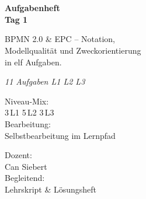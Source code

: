 \documentclass[11pt,a4paper,oneside]{article}
\newcommand{\caveatfontfallback}{\itshape}
\newcommand\caveatfont{\caveatfontfallback}%
\begin{document}
\begin{titlepage}
  \pagestyle{empty}
  \vspace*{1.5cm}
  \\[2pt]
  \noindent{\color{lpAccent}\rule{\linewidth}{1.2pt}}\\[4pt]

  \vspace{3cm}
  {\sffamily\fontsize{30}{34}\selectfont\bfseries\color{lpInk}Aufgabenheft\\Tag 1\par}

  \vspace{0.7cm}
  {\sffamily\large\color{lpGray}BPMN 2.0 \& EPC -- Notation,\\Modellqualit\"at und Zweck\-orientierung\\in elf Aufgaben.\par}

  \vspace{1.5cm}
  {\caveatfont\LARGE\color{lpAmber}11 Aufgaben \textperiodcentered{} L1 \textperiodcentered{} L2 \textperiodcentered{} L3}\par

  \vfill

  \noindent\begin{minipage}{0.55\linewidth}
    {\sffamily\footnotesize\color{lpGray}Niveau-Mix:}\\
    {\sffamily\small\color{lpInk}3\,\textsf{L1} \textperiodcentered{} 5\,\textsf{L2} \textperiodcentered{} 3\,\textsf{L3}}\\[10pt]
    {\sffamily\footnotesize\color{lpGray}Bearbeitung:}\\
    {\sffamily\small\color{lpInk}Selbstbearbeitung im Lernpfad}
  \end{minipage}\hfill
  \begin{minipage}{0.4\linewidth}
    \raggedleft
    {\sffamily\footnotesize\color{lpGray}Dozent:}\\
    {\sffamily\small\color{lpInk}Can Siebert}\\[10pt]
    {\sffamily\footnotesize\color{lpGray}Begleitend:}\\
    {\sffamily\small\color{lpInk}Lehrskript \& L\"osungsheft}
  \end{minipage}

  \vspace{0.5cm}
  \noindent{\color{lpAccent}\rule{\linewidth}{0.6pt}}
\end{titlepage}
\end{document}
